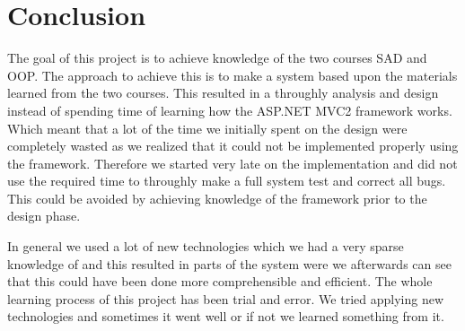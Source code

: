 \chapter{Conclusion}
\label{chap:conclusion}


The goal of this project is to achieve knowledge of the two courses SAD and OOP. The approach to achieve this is to make a system based upon the materials learned from the two courses. 
This resulted in a throughly analysis and design instead of spending time of learning how the ASP.NET MVC2 framework works.
Which meant that a lot of the time we initially spent on the design were completely wasted as we realized that it could not be implemented properly using the framework. 
Therefore we started very late on the implementation and did not use the required time to throughly make a full system test and correct all bugs. 
This could be avoided by achieving knowledge of the framework prior to the design phase. 




In general we used a lot of new technologies which we had a very sparse knowledge of and this resulted in parts of the system were we afterwards can see that this could have been done more comprehensible and efficient. 
The whole learning process of this project has been trial and error. 
We tried applying new technologies and sometimes it went well or if not we learned something from it. 


